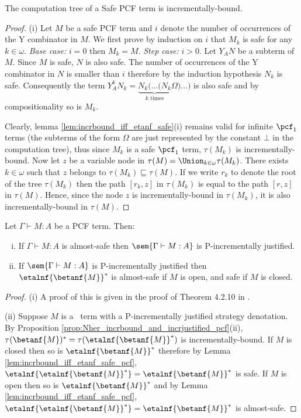 \begin{lemma} \label{lem:pcf_safe_imp_incrbound} The computation tree of a Safe PCF term is incrementally-bound.
\end{lemma}
\begin{proof}
(i) Let $M$ be a safe PCF term and  $i$ denote the number of occurrences of the Y combinator in $M$.
We first prove by induction on $i$ that $M_k$ is safe for any $k\in
\omega$. \emph{Base case:} $i=0$ then $M_k = M$. \emph{Step case:}
$i>0$. Let $Y_A N$ be a subterm of $M$. Since $M$ is safe, $N$ is
also safe. The number of occurrences of the Y combinator in $N$ is
smaller than $i$ therefore by the induction hypothesis $N_k$ is
safe. Consequently the term $Y_A^k N_k = \underbrace{N_k ( \ldots (
N_k}_{k \mbox{ times}} \Omega ) \ldots )$ is also safe and by
compositionality so is $M_k$.

Clearly, lemma \ref{lem:incrbound_iff_etanf_safe}(i) remains
valid for infinite $\pcf_1$ terms (the subterms of the form $\Omega$
are just represented by the constant $\bot$ in the computation
tree), thus since $M_k$ is a safe $\pcf_1$ term, $\tau(M_k)$ is
incrementally-bound. Now let $z$ be a variable node in $\tau(M) =
\Union_{k\in\omega} \tau(M_k)$. There exists $k\in \omega$ such that
$z$ belongs to $\tau(M_k) \sqsubseteq \tau(M)$. If we write $r_k$ to
denote the root of the tree $\tau(M_k)$ then the path $[r_k,z]$ in
$\tau(M_k)$ is equal to the path $[r,z]$ in $\tau(M)$. Hence, since
the node $z$ is incrementally-bound in $\tau(M_k)$, it is also
incrementally-bound in $\tau(M)$.
\end{proof}




\begin{theorem}
\label{thm:almostsafeincrejust_pcf} Let $\Gamma \vdash M : A$ be a PCF term. Then:
\begin{enumerate}[(i)]
\item If $\Gamma \vdash M : A$ is almost-safe then $\sem{\Gamma \vdash M : A}$ is P-incrementally justified.
\item If $\sem{\Gamma \vdash M : A}$ is
  P-incrementally justified then $\etalnf{\betanf{M}}^*$ is
  almost-safe  if $M$ is open, and safe if $M$ is closed.
\end{enumerate}
\end{theorem}

\begin{proof}
\noindent(i)
A proof of this is given in the proof of Theorem 4.2.10 in \cite{blumtransfer}.

\noindent(ii) Suppose $M$ is a \pcf\ term with a P-incrementally
justified strategy denotation. By Proposition
\ref{prop:Nher_incrbound_and_incrjustified_pcf}(ii),
$\tau(\betanf{M})^* = \tau(\etalnf{\betanf{M}}^*)$ is
incrementally-bound. If $M$ is closed then so is
$\etalnf{\betanf{M}}^*$ therefore by Lemma
\ref{lem:incrbound_iff_etanf_safe_pcf},
$\etalnf{\etalnf{\betanf{M}}^*} = \etalnf{\betanf{M}}^*$ is safe. If
$M$ is open then so is $\etalnf{\betanf{M}}^*$ and by Lemma
\ref{lem:incrbound_iff_etanf_safe_pcf},
$\etalnf{\etalnf{\betanf{M}}^*} = \etalnf{\betanf{M}}^*$ is
almost-safe.
\end{proof}

